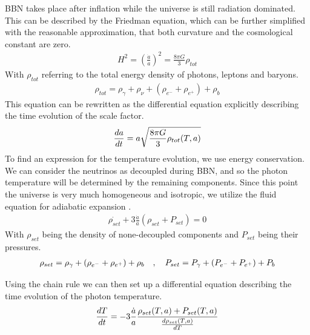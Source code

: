 BBN takes place after inflation while the universe is still radiation dominated. This can be described by the Friedman equation, which can be further simplified with the reasonable approximation, that both curvature and the cosmological constant are zero. 
\begin{align}
    H^2=\left(\frac{\dot{a}}{a}\right)^2=\frac{8\pi G}{3}\rho_{tot}
\end{align}
With $\rho_{tot}$ referring to the total energy density of photons, leptons and baryons.
\begin{align}
    \rho_{tot}=\rho_{\gamma}+\rho_{\nu}+(\rho_{e^-}+\rho_{e^+})+\rho_{b}
\end{align}
This equation can be rewritten as the differential equation explicitly describing the time evolution of the scale factor.
\begin{align}
    \frac{da}{dt}=a\sqrt{\frac{8\pi G}{3}\rho_{tot}(T,a)}
    \label{eq:dadt}
\end{align}
To find an expression for the temperature evolution, we use energy conservation. We can consider the neutrinos as decoupled during BBN, and so the photon temperature will be determined by the remaining components. Since this point the universe is very much homogeneous and isotropic, we utilize the fluid equation for adiabatic expansion \cite[{(4.44)}]{Ryden}. 
\begin{align}
    \dot{\rho_{set}}+3\frac{\dot{a}}{a}(\rho_{set} + P_{set})=0
\end{align}
With $\rho_{set}$ being the density of none-decoupled components and $P_{set}$ being their pressures.
\begin{align}
    \rho_{set}=\rho_{\gamma}+(\rho_{e^-}+\rho_{e^+})+\rho_{b}
    \quad , \quad P_{set}=P_{\gamma}+(P_{e^-}+P_{e^+})+P_{b}
\end{align}

Using the chain rule we can then set up a differential equation describing the time evolution of the photon temperature. 
\begin{align}
    \frac{dT}{dt}=-3\frac{\dot{a}}{a}\frac{\rho_{set}(T,a) + P_{set}(T,a)}{\frac{d\rho_{set}(T,a)}{dT}}
    \label{eq:dTdt}
\end{align}

